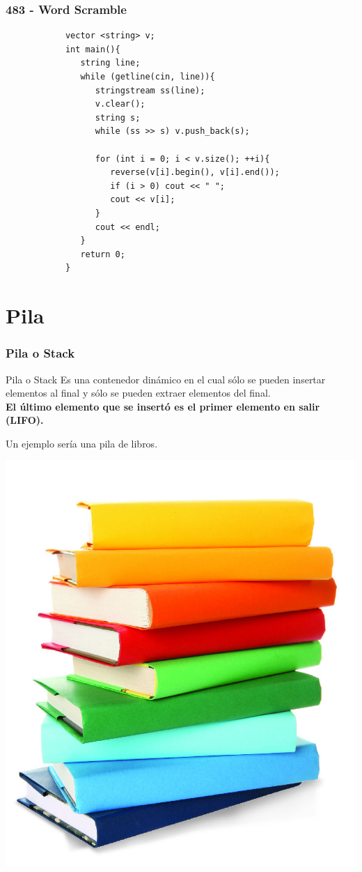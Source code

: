 \documentclass{beamer}
\begin{document}
	\begin{frame}[fragile]
		\frametitle{483 - Word Scramble}
		\begin{lstlisting}
			vector <string> v;
			int main(){
			   string line;
			   while (getline(cin, line)){
			      stringstream ss(line);
			      v.clear();
			      string s;
			      while (ss >> s) v.push_back(s);

			      for (int i = 0; i < v.size(); ++i){
			         reverse(v[i].begin(), v[i].end());
			         if (i > 0) cout << " ";
			         cout << v[i];
			      }
			      cout << endl;
			   }
			   return 0;
			}
		\end{lstlisting}

	\end{frame}


\section{Pila}
	\begin{frame}
		\frametitle{Pila o Stack}
		\begin{block}{Pila o Stack}
			Es una contenedor dinámico en el cual sólo se pueden
insertar elementos al final y sólo se pueden extraer elementos del final.\\
			\textbf{El último elemento que se insertó es el primer
elemento en salir (LIFO).}\\
		\end{block}		
		Un ejemplo sería una pila de libros.\\
		\begin{center}
			\includegraphics[height =
0.35\textheight]{stack_libros.jpg}
		\end{center}
	\end{frame}
\end{document}
